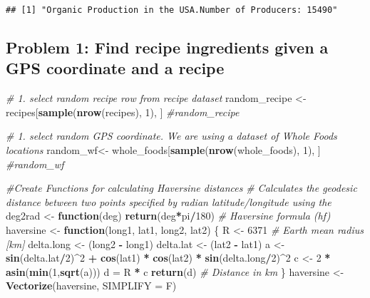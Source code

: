 \documentclass[]{article}
\newenvironment{Shaded}{\begin{snugshade}}{\end{snugshade}}
\newcommand{\KeywordTok}[1]{\textcolor[rgb]{0.13,0.29,0.53}{\textbf{#1}}}
\newcommand{\DataTypeTok}[1]{\textcolor[rgb]{0.13,0.29,0.53}{#1}}
\newcommand{\DecValTok}[1]{\textcolor[rgb]{0.00,0.00,0.81}{#1}}
\newcommand{\StringTok}[1]{\textcolor[rgb]{0.31,0.60,0.02}{#1}}
\newcommand{\CommentTok}[1]{\textcolor[rgb]{0.56,0.35,0.01}{\textit{#1}}}
\newcommand{\ControlFlowTok}[1]{\textcolor[rgb]{0.13,0.29,0.53}{\textbf{#1}}}
\newcommand{\OperatorTok}[1]{\textcolor[rgb]{0.81,0.36,0.00}{\textbf{#1}}}
\newcommand{\NormalTok}[1]{#1}
\begin{document}
\begin{verbatim}
## [1] "Organic Production in the USA.Number of Producers: 15490"
\end{verbatim}

\subsection{Problem 1: Find recipe ingredients given a GPS coordinate
and a
recipe}\label{problem-1-find-recipe-ingredients-given-a-gps-coordinate-and-a-recipe}

\begin{Shaded}
\begin{Highlighting}[]
\CommentTok{# 1. select random recipe row from recipe dataset}
\NormalTok{random_recipe <-}\StringTok{ }\NormalTok{recipes[}\KeywordTok{sample}\NormalTok{(}\KeywordTok{nrow}\NormalTok{(recipes), }\DecValTok{1}\NormalTok{), ]}
\CommentTok{#random_recipe}

\CommentTok{# 1. select random GPS coordinate. We are using a dataset of Whole Foods locations}
\NormalTok{random_wf<-}\StringTok{ }\NormalTok{whole_foods[}\KeywordTok{sample}\NormalTok{(}\KeywordTok{nrow}\NormalTok{(whole_foods), }\DecValTok{1}\NormalTok{), ]}
\CommentTok{#random_wf}

\CommentTok{#Create Functions for calculating Haversine distances}
\CommentTok{# Calculates the geodesic distance between two points specified by radian latitude/longitude using the}
\NormalTok{deg2rad <-}\StringTok{ }\ControlFlowTok{function}\NormalTok{(deg) }\KeywordTok{return}\NormalTok{(deg}\OperatorTok{*}\NormalTok{pi}\OperatorTok{/}\DecValTok{180}\NormalTok{)}
\CommentTok{# Haversine formula (hf)}
\NormalTok{haversine <-}\StringTok{ }\ControlFlowTok{function}\NormalTok{(long1, lat1, long2, lat2) \{}
\NormalTok{  R <-}\StringTok{ }\DecValTok{6371} \CommentTok{# Earth mean radius [km]}
\NormalTok{  delta.long <-}\StringTok{ }\NormalTok{(long2 }\OperatorTok{-}\StringTok{ }\NormalTok{long1)}
\NormalTok{  delta.lat <-}\StringTok{ }\NormalTok{(lat2 }\OperatorTok{-}\StringTok{ }\NormalTok{lat1)}
\NormalTok{  a <-}\StringTok{ }\KeywordTok{sin}\NormalTok{(delta.lat}\OperatorTok{/}\DecValTok{2}\NormalTok{)}\OperatorTok{^}\DecValTok{2} \OperatorTok{+}\StringTok{ }\KeywordTok{cos}\NormalTok{(lat1) }\OperatorTok{*}\StringTok{ }\KeywordTok{cos}\NormalTok{(lat2) }\OperatorTok{*}\StringTok{ }\KeywordTok{sin}\NormalTok{(delta.long}\OperatorTok{/}\DecValTok{2}\NormalTok{)}\OperatorTok{^}\DecValTok{2}
\NormalTok{  c <-}\StringTok{ }\DecValTok{2} \OperatorTok{*}\StringTok{ }\KeywordTok{asin}\NormalTok{(}\KeywordTok{min}\NormalTok{(}\DecValTok{1}\NormalTok{,}\KeywordTok{sqrt}\NormalTok{(a)))}
\NormalTok{  d =}\StringTok{ }\NormalTok{R }\OperatorTok{*}\StringTok{ }\NormalTok{c}
  \KeywordTok{return}\NormalTok{(d) }\CommentTok{# Distance in km}
\NormalTok{\}}
\NormalTok{haversine <-}\StringTok{ }\KeywordTok{Vectorize}\NormalTok{(haversine, }\DataTypeTok{SIMPLIFY =}\NormalTok{ F)}


\end{Highlighting}
\end{Shaded}
\end{document}
